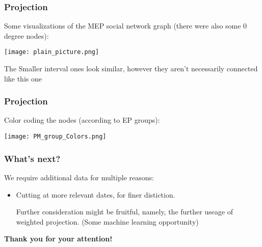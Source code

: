 \documentclass{beamer}
\begin{document}
\begin{frame}
	\frametitle{Projection}
	Some visualizations of the MEP social network graph (there were also some 0 degree nodes):
	\pause
	\begin{center}
		\texttt{[image: plain\_picture.png]}
	\end{center} 
	\pause 
	{\tiny The Smaller interval ones look similar, however they aren't necessarily connected like this one}
	
	
\end{frame}

\begin{frame}
	\frametitle{Projection}
	Color coding the nodes (according to EP groups):
	\pause
	\begin{center}
		\texttt{[image: PM\_group\_Colors.png]}
	\end{center} 
	
\end{frame}




\begin{frame}
\frametitle{What's next?}

We require additional data for multiple reasons:

\begin{itemize}

	\item Cutting at more relevant dates, for finer distiction.
	
\bigskip

Further consideration might be fruitful, namely, the further useage of weighted projection. (Some machine learning opportunity)

\end{itemize}
\end{frame}



\begin{frame}
\begin{center}
\Large{\textbf{Thank you for your attention!}}
\end{center}
\end{frame}
\end{document}
